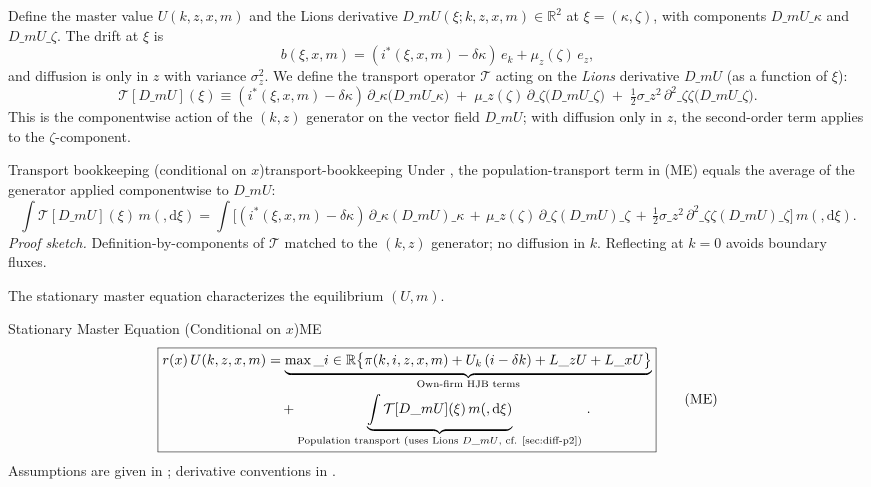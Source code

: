 ﻿\documentclass[11pt,letterpaper,oneside]{article}
\numberwithin{equation}{section}
\newcommand{\R}{\mathbb{R}}
\newcommand{\1}{\mathbf{1}}
\newcommand{\diff}{,\mathrm{d}}
\newcommand{\Lz}{L\_z}
\newcommand{\Lx}{L\_x}
\newcommand{\dmU}{D\_m U}
\newcommand{\Dm}{D\_m}
\begin{document}
Define the master value $U(k,z,x,m)$ and the Lions derivative $\dmU(\xi;k,z,x,m)\in\R^2$ at $\xi=(\kappa,\zeta)$, with components $\dmU\_\kappa$ and $\dmU\_\zeta$. The drift at $\xi$ is
\[
b(\xi,x,m)=(i^*(\xi,x,m)-\delta\kappa)\,e_k+\mu_z(\zeta)\,e_z,
\]
and diffusion is only in $z$ with variance $\sigma_z^2$. We define the transport operator $\mathcal{T}$ acting on the \emph{Lions} derivative $\dmU$ (as a function of $\xi$):
\[
\mathcal{T}[\dmU](\xi) \equiv (i^*(\xi,x,m)-\delta\kappa)\,\partial\_\kappa\big(\dmU\_\kappa\big)
\; +\; \mu\_z(\zeta)\,\partial\_\zeta\big(\dmU\_\zeta\big)
\; +\; \tfrac12\sigma\_z^2\,\partial^2\_{\zeta\zeta}\big(\dmU\_\zeta\big).
\]
This is the componentwise action of the $(k,z)$ generator on the vector field $\Dm U$; with diffusion only in $z$, the second-order term applies to the $\zeta$-component.

\begin{lemma}{Transport bookkeeping (conditional on $x$)}{transport-bookkeeping}
Under , the population-transport term in (ME) equals the average of the generator applied componentwise to $\Dm U$:
\[
\int \mathcal{T}[\Dm U](\xi)\, m(\diff \xi)
= \int \Big[(i^*(\xi,x,m)-\delta\kappa)\,\partial\_{\kappa}(\Dm U)\!\_\kappa
\,+\, \mu\_z(\zeta)\,\partial\_{\zeta}(\Dm U)\!\_\zeta
\,+\, \tfrac12\sigma\_z^2\,\partial^2\_{\zeta\zeta}(\Dm U)\!\_\zeta\Big] \, m(\diff \xi).
\]
\emph{Proof sketch.} Definition-by-components of $\mathcal{T}$ matched to the $(k,z)$ generator; no diffusion in $k$. Reflecting at $k=0$ avoids boundary fluxes.
\end{lemma}

The stationary master equation characterizes the equilibrium $(U,m)$.

\begin{theorem}{Stationary Master Equation (Conditional on $x$)}{ME}
\begin{equation}
\boxed{\begin{aligned}
r(x)\,U(k,z,x,m) &= \underbrace{\max\_{i\in\R}\big\{\pi(k,i,z,x,m) + U_k\,(i-\delta k) + \Lz U + \Lx U\big\}}_{\text{Own-firm HJB terms}} \\
&\quad + \underbrace{\int \mathcal{T}[\dmU](\xi)\, m(\diff \xi)}_{\text{Population transport (uses Lions $\Dm U$, cf. \Cref{sec:diff-p2})}}\,.
\end{aligned}}
\tag{ME}\label{eq:ME}
\end{equation}
Assumptions are given in ; derivative conventions in .
\end{theorem}
\end{document}
